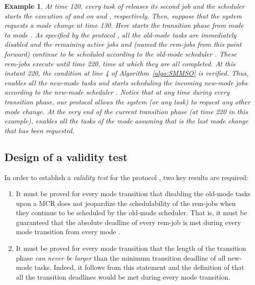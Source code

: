 \documentclass{article}
\newtheorem{validity test}{Validity Test}
\newtheorem{Example}{Example}
\begin{document}
\begin{Example}
At time 120, every task of  releases its second job and the scheduler  starts the execution of  and  on   and , respectively. Then, suppose that the system requests a mode change at time 130. Here starts the transition phase from mode  to mode . As specified by the protocol , all the old-mode tasks are immediately disabled and the remaining active jobs  and  (named the rem-jobs from this point forward) continue to be scheduled according to the old-mode scheduler . These rem-jobs execute until time 220, time at which they are all completed. At this instant 220, the condition at line 4 of Algorithm~\ref{algo:SMMSO} is verified. Thus,  enables all the new-mode tasks and starts scheduling the incoming new-mode jobs according to the new-mode scheduler . Notice that at any time \emph{during every transition phase}, our protocol  allows the system (or any task) to request any other mode change. At the very end of the current transition phase (at time 220 in this example),  enables all the tasks of the mode  assuming that  is the last mode change that has been requested.
\end{Example}

\subsection{Design of a validity test}
\label{sec:Multimode:SMMSO_main_idea}

In order to establish a {\em validity test} for the protocol , two key results are required:

\begin{enumerate}
\item It must be proved for every mode transition that disabling the old-mode tasks upon a MCR does not jeopardize the schedulability of the rem-jobs when they continue to be scheduled by the old-mode scheduler. That is, it must be guaranteed that the absolute deadline  of every rem-job  is met during every mode transition from every mode .

\item It must be proved for every mode transition that the length of the transition phase \emph{can never be larger} than the minimum transition deadline of all new-mode tasks. Indeed, it follows from this statement and the definition of  that all the transition deadlines would be met during every mode transition. 
\end{enumerate} 
\end{document}
